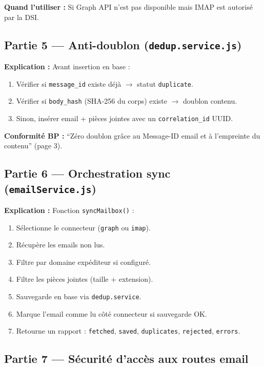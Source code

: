 \documentclass[12pt,a4paper]{article}
\begin{document}
\textbf{Quand l'utiliser :} Si Graph API n'est pas disponible mais IMAP est autorisé par la DSI.

\subsection{Partie 5 --- Anti-doublon (\texttt{dedup.service.js})}

\textbf{Explication :} Avant insertion en base :

\begin{enumerate}
  \item Vérifier si \texttt{message\_id} existe déjà $\rightarrow$ statut \texttt{duplicate}.
  \item Vérifier si \texttt{body\_hash} (SHA-256 du corps) existe $\rightarrow$ doublon contenu.
  \item Sinon, insérer email + pièces jointes avec un \texttt{correlation\_id} UUID.
\end{enumerate}

\textbf{Conformité BP :} ``Zéro doublon grâce au Message-ID email et à l'empreinte du contenu'' (page 3).

\subsection{Partie 6 --- Orchestration sync (\texttt{emailService.js})}

\textbf{Explication :} Fonction \texttt{syncMailbox()} :

\begin{enumerate}
  \item Sélectionne le connecteur (\texttt{graph} ou \texttt{imap}).
  \item Récupère les emails non lus.
  \item Filtre par domaine expéditeur si configuré.
  \item Filtre les pièces jointes (taille + extension).
  \item Sauvegarde en base via \texttt{dedup.service}.
  \item Marque l'email comme lu côté connecteur si sauvegarde OK.
  \item Retourne un rapport : \texttt{fetched}, \texttt{saved}, \texttt{duplicates}, \texttt{rejected}, \texttt{errors}.
\end{enumerate}

\subsection{Partie 7 --- Sécurité d'accès aux routes email}
\end{document}
